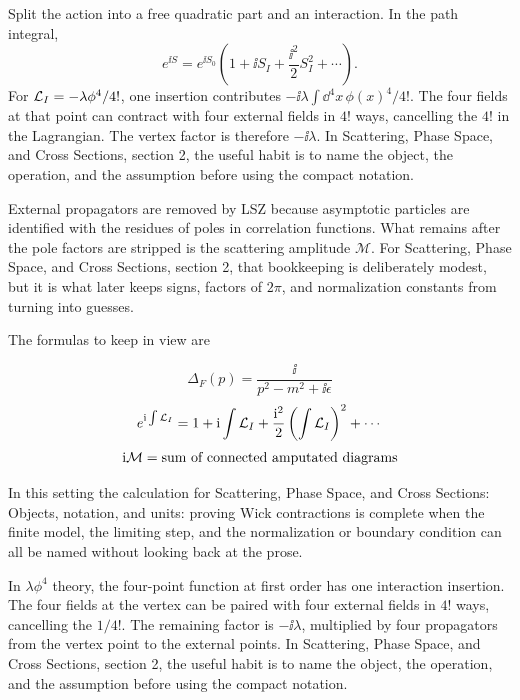 Split the action into a free quadratic part and an interaction.  In the path integral,
\[
  e^{\ii S}=e^{\ii S_0}\left(1+\ii S_I+\frac{\ii^2}{2}S_I^2+\cdots\right).
\]
For \(\mathcal L_I=-\lambda\phi^4/4!\), one insertion contributes \(-\ii\lambda\int\dd^4x\,\phi(x)^4/4!\).  The four fields at that point can contract with four external fields in \(4!\) ways, cancelling the \(4!\) in the Lagrangian.  The vertex factor is therefore \(-\ii\lambda\).  In Scattering, Phase Space, and Cross Sections, section 2, the useful habit is to name the object, the operation, and the assumption before using the compact notation.

External propagators are removed by LSZ because asymptotic particles are identified with the residues of poles in correlation functions.  What remains after the pole factors are stripped is the scattering amplitude \(\mathcal M\).  For Scattering, Phase Space, and Cross Sections, section 2, that bookkeeping is deliberately modest, but it is what later keeps signs, factors of \(2\pi\), and normalization constants from turning into guesses.

The formulas to keep in view are

\[
  \Delta_F(p)=\frac{\ii}{p^2-m^2+\ii\epsilon}
\]
\[
  e^{\mathrm i\int\mathcal L_I}=1+\mathrm i\int\mathcal L_I+\frac{\mathrm i^2}{2}\left(\int\mathcal L_I\right)^2+\cdots
\]
\[
  \mathrm i\mathcal M=\hbox{sum of connected amputated diagrams}
\]

In this setting the calculation for Scattering, Phase Space, and Cross Sections: Objects, notation, and units: proving Wick contractions is complete when the finite model, the limiting step, and the normalization or boundary condition can all be named without looking back at the prose.




\begin{example}
In \(\lambda\phi^4\) theory, the four-point function at first order has one interaction insertion.  The four fields at the vertex can be paired with four external fields in \(4!\) ways, cancelling the \(1/4!\).  The remaining factor is \(-\ii\lambda\), multiplied by four propagators from the vertex point to the external points.  In Scattering, Phase Space, and Cross Sections, section 2, the useful habit is to name the object, the operation, and the assumption before using the compact notation.
\end{example}



